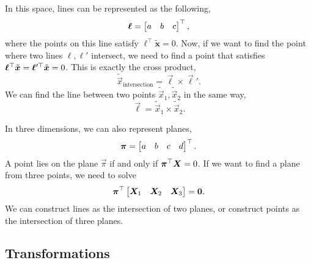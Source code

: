 In this space, lines can be represented as the following, \[
  \bm{\ell} = \begin{bmatrix} a & b & c \end{bmatrix}^\top
,\]
where the points on this line satisfy $\bm{\ell}^\top\tilde{\bm{x}}=0$. Now,
if we want to find the point where two lines $\bm{\ell},\bm{\ell}'$
intersect, we need to find a point that satisfies
$\bm{\ell}^\top \tilde{\bm{x}} = \bm{\ell}'^\top\tilde{\bm{x}} = 0$. This is
exactly the cross product, \[
  \tilde{\vec{x}}_{\text{intersection}} = \vec{\ell} \times \vec{\ell}'
.\]
We can find the line between two points $\tilde{\vec{x}}_1,\tilde{\vec{x}}_2$
in the same way, \[
  \vec{\ell} = \tilde{\vec{x}}_1 \times \tilde{\vec{x}}_2
.\]

In three dimensions, we can also represent planes, \[
  \bm{\pi} = \begin{bmatrix} a & b & c & d \end{bmatrix}^\top
.\]
A point lies on the plane $\vec{\pi}$ if and only if $\bm{\pi}^\top
\bm{X}=0$.  If we want to find a plane from three points, we need to solve \[
  \bm{\pi}^\top \begin{bmatrix} \bm{X}_1 & \bm{X}_2 & \bm{X}_3 \end{bmatrix} = \bm{0}
.\]
We can construct lines as the intersection of two planes, or construct
points as the intersection of three planes.

\subsection{Transformations}

